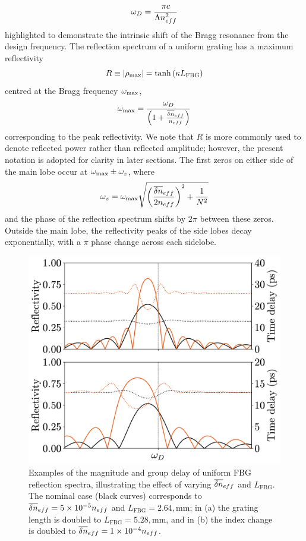 %
\begin{equation}
    \omega_D = \frac{\pi c}{\Lambda n_{eff}^2}
\end{equation}
%
highlighted to demonstrate the intrinsic shift of the Bragg resonance from the design frequency.
The reflection spectrum of a uniform grating has a maximum reflectivity
%
\begin{equation}
\label{eq:rmax}
    R \equiv |\rho_\text{max}| = \tanh{(\kappa L_\text{FBG})}
\end{equation}
%
centred at the Bragg frequency $\omega_\text{max}$,
%
\begin{equation}
\label{eq:wBragg}
    \omega_\text{max} = \frac{\omega_D}{\left( 1 + \frac{\overline{\delta n}_{eff} }{n_{eff}}\right)}
\end{equation}
%
corresponding to the peak reflectivity.
We note that $R$ is more commonly used to denote reflected power rather than reflected amplitude; however, the present notation is adopted for clarity in later sections.
The first zeros on either side of the main lobe occur at $\omega_\text{max} \pm \omega_z$, where
%
\begin{equation}
\label{eq:wz}
    \omega_z = \omega_\text{max} \sqrt{\left( \frac{\overline{\delta n}_{eff}}{2 n_{eff}} \right)^2 + \frac{1}{N^2} }
\end{equation}
%
and the phase of the reflection spectrum shifts by $2\pi$ between these zeros.
Outside the main lobe, the reflectivity peaks of the side lobes decay exponentially, with a $\pi$ phase change across each sidelobe.
%
\begin{figure}[!t]
    \includegraphics[width=\linewidth]{Images/Uniform_varying_L_dneff.pdf}
    \caption{Examples of the magnitude and group delay of uniform FBG reflection spectra, illustrating the effect of varying $\overline{\delta n}_{eff}$ and $L_\text{FBG}$.
    The nominal case (black curves) corresponds to $\overline{\delta n}_{eff} = 5\times 10^{-5}n_{eff}$ and $L_\text{FBG} = 2.64,\text{mm}$; in (a) the grating length is doubled to $L_\text{FBG} = 5.28,\text{mm}$, and in (b) the index change is doubled to $\overline{\delta n}_{eff} = 1\times 10^{-4}n_{eff}$.}
    \label{fig:uniform_spectra_varyLdneff}
\end{figure}

